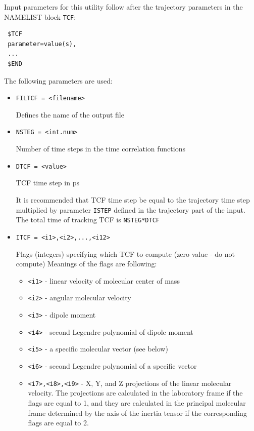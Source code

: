 \documentclass{article}
\begin{document}
Input parameters for this utility follow after the trajectory parameters
in the NAMELIST block \verb|TCF|:

\begin{verbatim}
 $TCF
 parameter=value(s),
 ...
 $END
\end{verbatim}

The following parameters are used:

\begin{itemize}

\item
\verb|FILTCF = <filename>|

Defines the name of the output file

\item
\verb|NSTEG = <int.num>|

Number of time steps in the time correlation functions

\item
\verb|DTCF = <value>|

TCF time step in ps

It is recommended that TCF time step be equal to the trajectory time
step multiplied by parameter \verb|ISTEP| defined in the trajectory part 
of the input. The total time of tracking TCF is \verb|NSTEG*DTCF|

\item
\verb|ITCF = <i1>,<i2>,...,<i12>|

Flags (integers) specifying which TCF to compute (zero value - do not compute)
Meanings of the flags are following:

\begin{itemize}

\item
\verb|<i1>| - linear velocity of molecular center of mass

\item
\verb|<i2>| - angular molecular velocity 

\item
\verb|<i3>| - dipole moment

\item
\verb|<i4>| - second Legendre polynomial of dipole moment

\item
\verb|<i5>| - a specific molecular vector (see below)

\item
\verb|<i6>| - second Legendre polynomial of a specific vector

\item
\verb|<i7>,<i8>,<i9>| - X, Y, and Z projections of the linear molecular
velocity. The projections are calculated in the laboratory frame if 
the flags are equal to 1, and they are calculated in the principal
molecular frame determined by the axis of the inertia tensor if the
corresponding flags are equal to 2.


\end{itemize}
\end{itemize}
\end{document}
